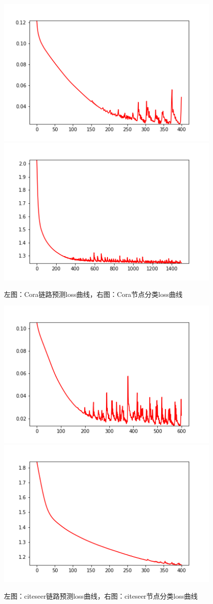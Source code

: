 \documentclass{article}
\begin{document}
	 \begin{figure}[h]
		\includegraphics[scale=0.5]{loss-52.png}
		\quad
		\includegraphics[scale=0.5]{loss-51.png}
		\caption{左图：Cora链路预测loss曲线，右图：Cora节点分类loss曲线}
	\end{figure}
	\begin{figure}[h]
		\includegraphics[scale=0.5]{loss-55.png}
		\quad
		\includegraphics[scale=0.5]{loss-95.png}
		\caption{左图：citeseer链路预测loss曲线，右图：citeseer节点分类loss曲线}
	\end{figure}
\end{document}
